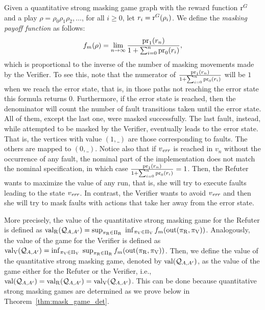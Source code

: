 Given a quantitative strong masking game graph with the reward function $\operatorname{r}^G$ and a play 
$\rho = \rho_0 \rho_1 \rho_2, \ldots$, for all $i \geq 0$, let 
$r_i = \operatorname{r}^G(\rho_i)$.
We define the \emph{masking payoff function} as follows: 
\[%
\FMask(\rho) = \lim_{n \rightarrow \infty}  \frac{\pr{1}{r_n}}{1+ \sum^{n}_{i=0} \pr{0}{r_i}},
\]
which is proportional to the inverse of the number of masking movements made by the Verifier. To see this, note that the numerator of $\frac{\operatorname{pr}_{1}(r_n)}{1+ \sum^{n}_{i=0} \operatorname{pr}_{0}(r_i)}$ will be $1$
when we reach the error state, that is, in those paths not reaching the error state this formula returns $0$. Furthermore, if the error state is reached, then the denominator will count the number of fault transitions
taken until the error state. All of them, except the last one, were masked successfully.  The last fault, instead, while attempted to be masked by the Verifier, eventually leads to the error state.
That is, the vertices with value $(1,\_)$ are those corresponding to faults.  The others are mapped to $(0,\_)$.
Notice also that if $v_{\mathit{err}}$ is reached in $v_n$ without the occurrence of any fault, the nominal part of the implementation does not match the nominal specification, in which case $\frac{\operatorname{pr}_{1}(r_n)}{1+ \sum^{n}_{i=0} \operatorname{pr}_{0}(r_i)}=1$.
Then, 
the Refuter wants to maximize the value of any run, that is, she will try to execute  faults leading to the state $v_{\mathit{err}}$. 
In contrast, the Verifier wants to avoid $v_{\mathit{err}}$ and then she will try to mask faults with actions that take her away from the error state. 

More precisely, the value of the quantitative strong masking game for the Refuter is defined as  $\operatorname{val}_{\mathrm{R}}(\mathcal{Q}_{A, A'}) = \sup_{\pi_{\mathrm{R}} \in \Pi_{\mathrm{R}}} \; \inf_{\pi_{\mathrm{V}} \in \Pi_{\mathrm{V}}} f_{m}(\operatorname{out}(\pi_{\mathrm{R}}, \pi_{\mathrm{V}}))$. Analogously, the value of the game for the Verifier is defined as $\operatorname{val}_{\mathrm{V}}(\mathcal{Q}_{A, A'}) = \inf_{\pi_{\mathrm{V}} \in \Pi_{\mathrm{V}}} \; \sup_{\pi_{\mathrm{R}} \in \Pi_{\mathrm{R}}} f_{m}(\operatorname{out}(\pi_{\mathrm{R}}, 
\pi_{\mathrm{V}}))$. Then, we define the value of the quantitative strong masking game, denoted by $\operatorname{val}(\mathcal{Q}_{A, A'})$, as the value 
of the game either for the Refuter or the Verifier, i.e., $\operatorname{val}(\mathcal{Q}_{A, A'}) = \operatorname{val}_{\mathrm{R}}(\mathcal{Q}_{A, A'}) = \operatorname{val}_{\mathrm{V}}(\mathcal{Q}_{A, A'})$. This can be done because 
quantitative strong masking games are determined as we prove below in Theorem~\ref{thm:mask_game_det}. \\

